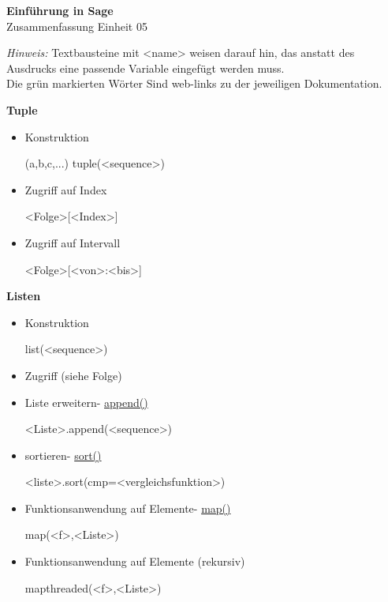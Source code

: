 \documentclass[a4paper,9pt,DIV15,twocolumn]{scrartcl}
\begin{document}
\begin{center}
    \textbf{\LARGE Einführung in Sage}\\
    {\large Zusammenfassung Einheit 05}
\end{center}
\textsl{Hinweis:} Textbausteine mit <name> weisen darauf hin, das anstatt des Ausdrucks eine passende Variable eingefügt werden muss.\\
Die {\color{Green}grün} markierten Wörter Sind web-links zu der jeweiligen Dokumentation.

\medskip
\textbf{Tuple}
\begin{itemize}
 \item Konstruktion
\begin{sagein}
 (a,b,c,...)
 tuple(<sequence>)
\end{sagein}
 \item Zugriff auf Index
\begin{sagein}
<Folge>[<Index>]
\end{sagein}
 \item Zugriff auf Intervall
\begin{sagein}
<Folge>[<von>:<bis>]
\end{sagein}
\end{itemize}


\textbf{Listen}
\begin{itemize}
 \item Konstruktion
\begin{sagein}
[a,b,c,...] 
list(<sequence>)
\end{sagein}
\item Zugriff (siehe Folge)
\item Liste erweitern- \href{https://sage.math.uni-goettingen.de/doc/static/reference/sage/misc/explain_pickle.html?highlight=append#sage.misc.explain_pickle.TestAppendList}{append()}
\begin{sagein}
<Liste>.append(<sequence>)
\end{sagein}
\item sortieren- \href{https://sage.math.uni-goettingen.de/doc/static/reference/sage/structure/sequence.html?highlight=sort#sage.structure.sequence.Sequence_generic.sort}{sort()}
\begin{sagein}
 <liste>.sort(cmp=<vergleichsfunktion>)
\end{sagein}
\item Funktionsanwendung auf Elemente- \href{https://sage.math.uni-goettingen.de/doc/static/reference/sage/combinat/generator.html?highlight=map#sage.combinat.generator.map}{map()}
\begin{sagein}
 map(<f>,<Liste>)
\end{sagein}
\item Funktionsanwendung auf Elemente (rekursiv)
\begin{sagein}
 mapthreaded(<f>,<Liste>)
\end{sagein}
\end{itemize}
\end{document}
